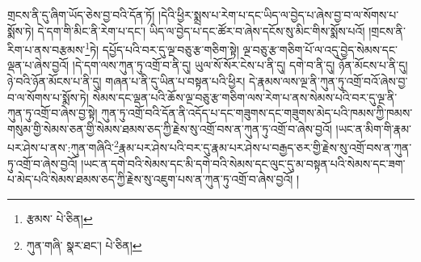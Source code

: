 གྲངས་ནི་དུ་ཞིག་ཡོད་ཅེས་བྱ་བའི་དོན་ཏོ། །དེའི་ཕྱིར་སྨྲས་པ་རེག་པ་དང་ཡིད་ལ་བྱེད་པ་ཞེས་བྱ་བ་ལ་སོགས་པ་སྨོས་ཏེ། དེ་དག་གི་མིང་ནི་རེག་པ་དང་། ཡིད་ལ་བྱེད་པ་དང་ཚོར་བ་ཞེས་དངོས་སུ་མིང་གིས་སྨོས་པའོ། །གྲངས་ནི་རིག་པ་ནས་བརྩམས་\footnote{རྩམས་  པེ་ཅིན། }ཏེ། དཔྱོད་པའི་བར་དུ་ལྔ་བཅུ་རྩ་གཅིག་སྟེ། ལྔ་བཅུ་རྩ་གཅིག་པོ་ལ་འདུ་བྱེད་སེམས་དང་ལྡན་པ་ཞེས་བྱའོ། །དེ་དག་ལས་ཀུན་ཏུ་འགྲོ་བ་ནི་དུ། ཡུལ་སོ་སོར་ངེས་པ་ནི་དུ། དགེ་བ་ནི་དུ། ཉོན་མོངས་པ་ནི་དུ། ཉེ་བའི་ཉོན་མོངས་པ་ནི་དུ། གཞན་པ་ནི་དུ་ཡིན་པ་བསྟན་པའི་ཕྱིར། དེ་རྣམས་ལས་ལྔ་ནི་ཀུན་ཏུ་འགྲོ་བའོ་ཞེས་བྱ་བ་ལ་སོགས་པ་སྨོས་ཏེ། སེམས་དང་ལྡན་པའི་ཆོས་ལྔ་བཅུ་རྩ་གཅིག་ལས་རེག་པ་ནས་སེམས་པའི་བར་དུ་ལྔ་ནི་ཀུན་ཏུ་འགྲོ་བ་ཞེས་བྱ་སྟེ། ཀུན་ཏུ་འགྲོ་བའི་དོན་ནི་འདོད་པ་དང་གཟུགས་དང་གཟུགས་མེད་པའི་ཁམས་ཀྱི་ཁམས་གསུམ་གྱི་སེམས་ཅན་གྱི་སེམས་ཐམས་ཅད་ཀྱི་རྗེས་སུ་འགྲོ་བས་ན་ཀུན་ཏུ་འགྲོ་བ་ཞེས་བྱའོ། །ཡང་ན་མིག་གི་རྣམ་པར་ཤེས་པ་ནས་:ཀུན་གཞིའི་\footnote{ཀུན་གཞི་  སྣར་ཐང་།  པེ་ཅིན། }རྣམ་པར་ཤེས་པའི་བར་དུ་རྣམ་པར་ཤེས་པ་བརྒྱད་ཅར་གྱི་རྗེས་སུ་འགྲོ་བས་ན་ཀུན་ཏུ་འགྲོ་བ་ཞེས་བྱའོ། །ཡང་ན་དགེ་བའི་སེམས་དང་མི་དགེ་བའི་སེམས་དང་ལུང་དུ་མ་བསྟན་པའི་སེམས་དང་ཟག་པ་མེད་པའི་སེམས་ཐམས་ཅད་ཀྱི་རྗེས་སུ་འཇུག་པས་ན་ཀུན་ཏུ་འགྲོ་བ་ཞེས་བྱའོ། །
